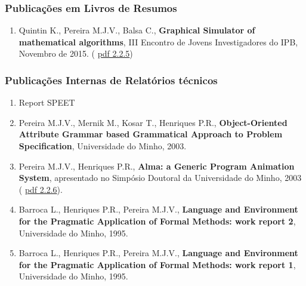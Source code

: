 \documentclass[11pt]{article}
\begin{document}
\subsubsection{Publicações em Livros de Resumos} 
\begin{enumerate}  
\item{Quintin K., Pereira M.J.V., Balsa C., {
\bf{ Graphical Simulator of mathematical algorithms}}, III Encontro de Jovens Investigadores do IPB, Novembro de 2015. (
\href{run:Publicacoes/GraSMA.pdf}{pdf 2.2.5})}
\end{enumerate}
\subsubsection{Publicações Internas de Relatórios técnicos} 
\begin{enumerate}  
\item{Report SPEET}
\item{Pereira M.J.V., Mernik M., Kosar T., Henriques P.R., {
\bf{ Object-Oriented Attribute Grammar based Grammatical Approach to Problem Specification}}, Universidade do Minho, 2003.}
\item{Pereira M.J.V., Henriques P.R., {
\bf{ Alma: a Generic Program Animation System}}, apresentado no Simpósio Doutoral da Universidade do Minho, 2003 (
\href{run:Publicacoes/ArtigoSimDoutoral.pdf}{pdf 2.2.6}).}
\item{Barroca L., Henriques P.R., Pereira M.J.V., {
\bf{ Language and Environment for the Pragmatic Application of Formal Methods: work report 2}}, Universidade do Minho, 1995. }
\item{Barroca L., Henriques P.R., Pereira M.J.V., {
\bf{ Language and Environment for the Pragmatic Application of Formal Methods: work report 1}}, Universidade do Minho, 1995. }
\end{enumerate} 
\end{document}
